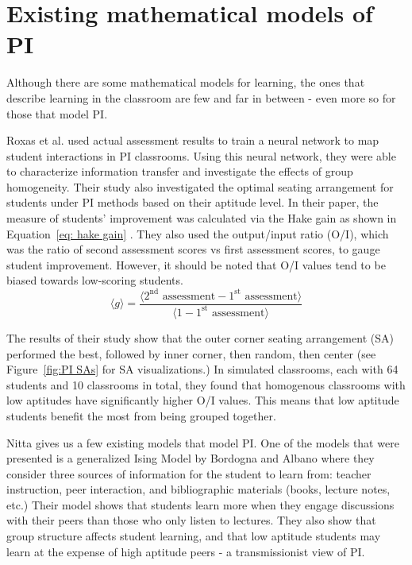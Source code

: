 \section{Existing mathematical models of PI}
Although there are some mathematical models for learning, the ones that describe learning in the classroom are few and far in between - even more so for those that model PI.

Roxas et al. \cite{roxas2010seating} used actual assessment results to train a neural network to map student interactions in PI classrooms. 
Using this neural network, they were able to characterize information transfer and investigate the effects of group homogeneity. 
Their study also investigated the optimal seating arrangement for students under PI methods based on their aptitude level.
In their paper, the measure of students' improvement was calculated via the Hake gain as shown in Equation~\ref{eq: hake gain} \cite{hake1998}.
They also used the output/input ratio (O/I), which was the ratio of second assessment scores vs first assessment scores, to gauge student improvement.
However, it should be noted that O/I values tend to be biased towards low-scoring students.
\begin{equation}
    \label{eq: hake gain}
    \langle g \rangle = \frac{\langle 2^{\text{nd}}\text{ assessment} - 1^{\text{st}}\text{ assessment} \rangle}{\langle 1 - 1^{\text{st}}\text{ assessment} \rangle}
\end{equation}

The results of their study show that the outer corner seating arrangement (SA) performed the best, followed by inner corner, then random, then center (see Figure~\ref{fig:PI SAs} for SA visualizations.)
In simulated classrooms, each with 64 students and 10 classrooms in total, they found that homogenous classrooms with low aptitudes have significantly higher O/I values.
This means that low aptitude students benefit the most from being grouped together.

Nitta \cite{nitta2019mathematical} gives us a few existing models that model PI. 
One of the models that were presented is a generalized Ising Model by Bordogna and Albano \cite{bordogna2001theoretical,bordogna2003simulation} where they consider three sources of information for the student to learn from: teacher instruction, peer interaction, and bibliographic materials (books, lecture notes, etc.)
Their model shows that students learn more when they engage discussions with their peers than those who only listen to lectures.
They also show that group structure affects student learning, and that low aptitude students may learn at the expense of high aptitude peers - a transmissionist view of PI.


